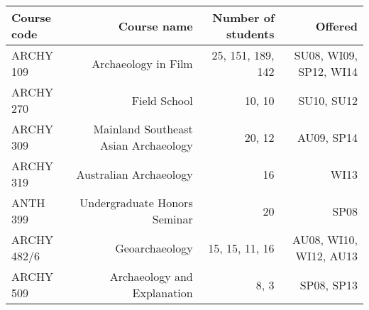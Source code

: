 \documentclass[11pt,article,oneside,oldfontcommands]{memoir}
\begin{document}
\begin{center}
\begin{tabular}{lrrr} 
   Course code& Course name& Number of students& Offered\\
  \midrule
    ARCHY 109    & Archaeology in Film            & 25, 151, 189, 142           & SU08, WI09, SP12, WI14\\ 
    ARCHY 270    & Field School                         & 10, 10                            & SU10, SU12\\
    ARCHY 309    & Mainland Southeast Asian Archaeology & 20, 12       & AU09, SP14\\
    ARCHY 319    & Australian Archaeology      & 16                                  & WI13\\
    ANTH 399     & Undergraduate Honors Seminar         & 20                  & SP08\\
    ARCHY 482/6    & Geoarchaeology                  & 15, 15, 11, 16                 & AU08, WI10, WI12, AU13\\
    ARCHY 509    & Archaeology and Explanation   & 8, 3                        & SP08, SP13\\
    \bottomrule
\end{tabular}
\end{center}

\medskip 

\end{document}
